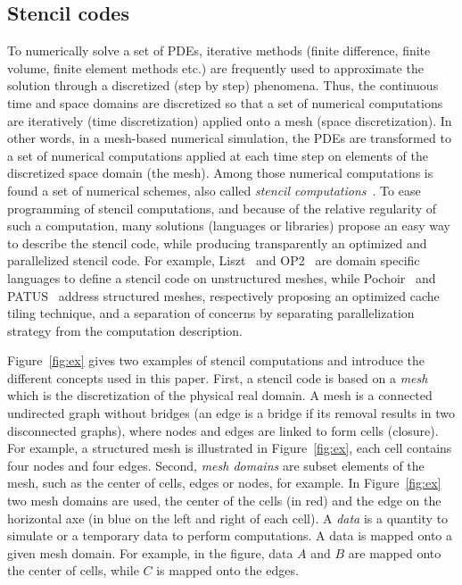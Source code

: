 \subsection{Stencil codes}
\label{sect:stencil}
To numerically solve a set of PDEs, iterative methods (finite difference, finite volume, finite element methods etc.) are frequently used to approximate the solution through a discretized (step by step) phenomena. Thus, the continuous time and space domains are discretized so that a set of numerical computations are iteratively (time discretization) applied onto a mesh (space discretization). In other words, in a mesh-based numerical simulation, the PDEs are transformed to a set of numerical computations applied at each time step on elements of the discretized space domain (the mesh). Among those numerical computations is found a set of numerical schemes, also called \textit{stencil computations}~\cite{spaaTangCKLL11}. To ease programming of stencil computations, and because of the relative regularity of such a computation, many solutions (languages or libraries) propose an easy way to describe the stencil code, while producing transparently an optimized and parallelized stencil code. For example, Liszt~\cite{DeVito2011LDS} and OP2~\cite{Giles2011} are domain specific languages to define a stencil code on unstructured meshes, while Pochoir~\cite{spaaTangCKLL11} and PATUS~\cite{citeulike12258902} address structured meshes, respectively proposing an optimized cache tiling technique, and a separation of concerns by separating parallelization strategy from the computation description.

Figure~\ref{fig:ex} gives two examples of stencil computations and introduce the different concepts used in this paper. First, a stencil code is based on a \emph{mesh} which is the discretization of the physical real domain. A mesh is a connected undirected graph without bridges (an edge is a bridge if its removal results in two disconnected graphs), where nodes and edges are linked to form cells (closure). For example, a structured mesh is illustrated in Figure~\ref{fig:ex}, each cell contains four nodes and four edges. Second, \emph{mesh domains} are subset elements of the mesh, such as the center of cells, edges or nodes, for example. In Figure~\ref{fig:ex} two mesh domains are used, the center of the cells (in red) and the edge on the horizontal axe (in blue on the left and right of each cell). A \emph{data} is a quantity to simulate or a temporary data to perform computations. A data is mapped onto a given mesh domain. For example, in the figure, data $A$ and $B$ are mapped onto the center of cells, while $C$ is mapped onto the edges.

